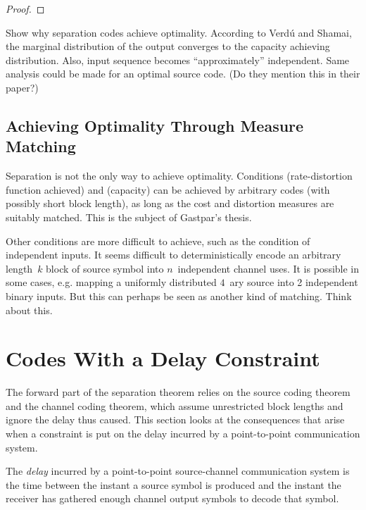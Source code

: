\begin{proof}

\end{proof}



Show why separation codes achieve optimality. According to Verd\'u and Shamai,
the marginal distribution of the output converges to the capacity achieving
distribution. Also, input sequence becomes ``approximately'' independent. Same
analysis could be made for an optimal source code. (Do they mention this in
their paper?)


\subsection{Achieving Optimality Through Measure Matching}

Separation is not the only way to achieve optimality. Conditions
(rate-distortion function achieved) and (capacity) can be achieved by arbitrary
codes (with possibly short block length), as long as the cost and distortion
measures are suitably matched. This is the subject of Gastpar's thesis.

Other conditions are more difficult to achieve, such as the condition of
independent inputs. It seems difficult to deterministically encode an arbitrary
length~$k$ block of source symbol into $n$~independent channel uses. 
It is possible in some cases, e.g. mapping a uniformly distributed $4$~ary
source into 2 independent binary inputs. But this can perhaps be seen as another
kind of matching. Think about this.


\section{Codes With a Delay Constraint}

The forward part of the separation theorem relies on the source coding theorem
and the channel coding theorem, which assume unrestricted block lengths and
ignore the delay thus caused. This section looks at the consequences that arise
when a constraint is put on the delay incurred by a point-to-point communication
system.

\begin{definition}
  \label{def:delay}
  The \emph{delay} incurred by a point-to-point source-channel communication
  system is the time between the instant a source symbol is produced and the
  instant the receiver has gathered enough channel output symbols to decode that
  symbol. 
\end{definition}


